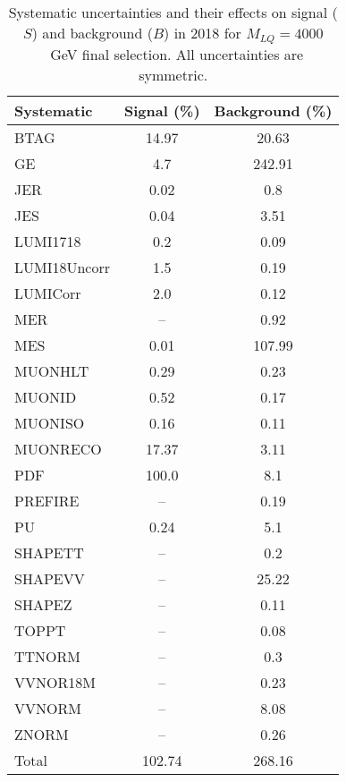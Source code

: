 \begin{table}[htbp]
\begin{center}
\caption{Systematic uncertainties and their effects on signal ($S$) and background ($B$) in 2018 for $M_{LQ}=4000$~GeV final selection. All uncertainties are symmetric.}
\begin{tabular}{lcc}
\hline\hline
Systematic & Signal (\%) & Background (\%) \\ \hline 
BTAG & 14.97 & 20.63\\ 
GE & 4.7 & 242.91\\ 
JER & 0.02 & 0.8\\ 
JES & 0.04 & 3.51\\ 
LUMI1718 & 0.2 & 0.09\\ 
LUMI18Uncorr & 1.5 & 0.19\\ 
LUMICorr & 2.0 & 0.12\\ 
MER & -- & 0.92\\ 
MES & 0.01 & 107.99\\ 
MUONHLT & 0.29 & 0.23\\ 
MUONID & 0.52 & 0.17\\ 
MUONISO & 0.16 & 0.11\\ 
MUONRECO & 17.37 & 3.11\\ 
PDF & 100.0 & 8.1\\ 
PREFIRE & -- & 0.19\\ 
PU & 0.24 & 5.1\\ 
SHAPETT & -- & 0.2\\ 
SHAPEVV & -- & 25.22\\ 
SHAPEZ & -- & 0.11\\ 
TOPPT & -- & 0.08\\ 
TTNORM & -- & 0.3\\ 
VVNOR18M & -- & 0.23\\ 
VVNORM & -- & 8.08\\ 
ZNORM & -- & 0.26\\ 
Total & 102.74 & 268.16\\ \hline \hline
\end{tabular}
\label{tab:SysUncertainties_uujj_4000}
\end{center}
\end{table}

